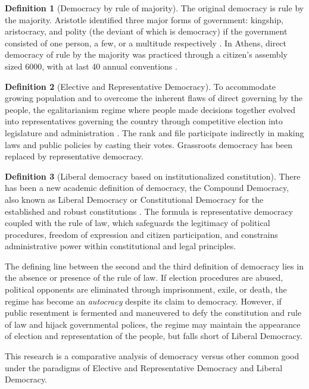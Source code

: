 \documentclass{scrartcl}
\theoremstyle{definition}
\newtheorem{definition}{Definition}
\begin{document}
\begin{definition}[Democracy by rule of majority]
The original democracy is rule by the majority. Aristotle identified
three major forms of government: kingship, aristocracy, and polity
(the deviant of which is democracy) if the government consisted of
one person, a few, or a multitude respectively \autocite{arispol}.
In Athens, direct democracy of rule by the majority was practiced
through a citizen's assembly sized 6000, with at last 40 annual conventions \autocite{Bao2018}. 
\end{definition}

\begin{definition}[Elective and Representative Democracy]
To accommodate growing population and to overcome the inherent flaws
of direct governing by the people, the egalitarianism regime where
people made decisions together evolved into representatives governing
the country through competitive election into legislature and administration
\autocite{capsocdem}. The rank and file participate indirectly in
making laws and public policies by casting their votes. Grassroots
democracy has been replaced by representative democracy. 
\end{definition}

\begin{definition}[Liberal democracy based on institutionalized constitution]
There has been a new academic definition of democracy, the Compound
Democracy, also known as Liberal Democracy or Constitutional Democracy
for the established and robust constitutions \autocite{Bao2018}. The
formula is representative democracy coupled with the rule of law,
which safeguards the legitimacy of political procedures, freedom of
expression and citizen participation, and constrains administrative
power within constitutional and legal principles. 
\end{definition}


The defining line between the second and the third definition of democracy
lies in the absence or presence of the rule of law. If election procedures
are abused, political opponents are eliminated through imprisonment,
exile, or death, the regime has become an \emph{autocracy} despite its claim
to democracy. However, if public resentment is fermented and maneuvered
to defy the constitution and rule of law and hijack governmental polices,
the regime may maintain the appearance of election and representation
of the people, but falls short of Liberal Democracy. 

This research is a comparative analysis of democracy versus other
common good under the paradigms of Elective and Representative Democracy
and Liberal Democracy. 
\end{document}
